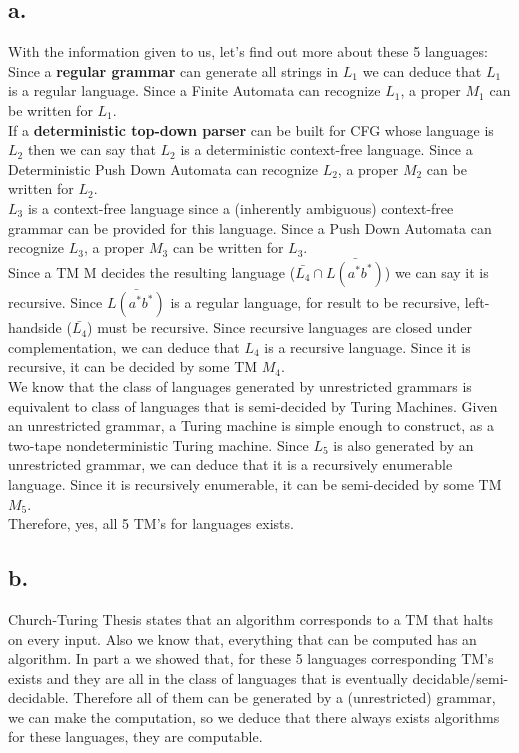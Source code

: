 \documentclass[12pt]{article}
\begin{document}
\subsection*{a.}
With the information given to us, let's find out more about these 5 languages: \\

Since a \textbf{regular grammar} can generate all strings in $L_1$ we can deduce that $L_1$ is a regular language. Since a Finite Automata can recognize $L_1$, a proper $M_1$ can be written for $L_1$. \\

If a \textbf{deterministic top-down parser} can be built for CFG whose language is $L_2$ then we can say that $L_2$ is a deterministic context-free language. Since a Deterministic Push Down Automata can recognize $L_2$, a proper $M_2$ can be written for $L_2$.\\

$L_3$ is a context-free language since a (inherently ambiguous) context-free grammar can be provided for this language. Since a Push Down Automata can recognize $L_3$, a proper $M_3$ can be written for $L_3$.\\

Since a TM M decides the resulting language ($\bar{L_4}\cap \bar{L(a^*b^*)}$) we can say it is recursive. Since $\bar{L(a^*b^*)}$ is a regular language, for result to be recursive, left-handside ($\bar{L_4}$) must be recursive. Since recursive languages are closed under complementation, we can deduce that $L_4$ is a recursive language. Since it is recursive, it can be decided by some TM $M_4$.\\

We know that the class of languages generated by unrestricted grammars is equivalent to class of languages that is semi-decided by Turing Machines. Given an unrestricted grammar, a Turing machine is simple enough to construct, as a two-tape nondeterministic Turing machine. Since $L_5$ is also generated by an unrestricted grammar, we can deduce that it is a recursively enumerable language. Since it is recursively enumerable, it can be semi-decided by some TM $M_5$.\\

Therefore, yes, all 5 TM's for languages exists.

\subsection*{b.}
Church-Turing Thesis states that an algorithm corresponds to a TM that halts on every input. Also we know that, everything that can be computed has an algorithm. In part a we showed that, for these 5 languages corresponding TM's exists and they are all in the class of languages that is eventually decidable/semi-decidable. Therefore all of them can be generated by a (unrestricted) grammar, we can make the computation, so we  deduce that there always exists algorithms for these languages, they are computable.
\end{document}
